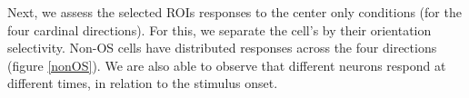 %
%



%
%

Next, we assess the selected ROIs responses to the center only conditions (for the four cardinal directions). For this, we separate the cell's by their orientation selectivity. Non-OS cells have distributed responses across the four directions (figure \ref{nonOS}). We are also able to observe that different neurons respond at different times, in relation to the stimulus onset.

